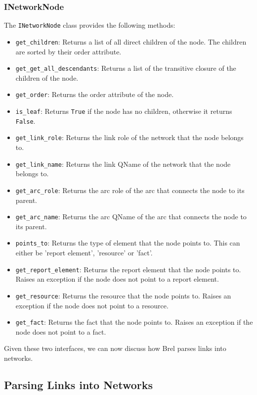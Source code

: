 \subsubsection{INetworkNode}

The \texttt{INetworkNode} class provides the following methods:

\begin{itemize}
    \item \texttt{get\_children}: Returns a list of all direct children of the node.
    The children are sorted by their order attribute.
    \item \texttt{get\_get\_all\_descendants}: Returns a list of the transitive closure of the children of the node.
    \item \texttt{get\_order}: Returns the order attribute of the node.
    \item \texttt{is\_leaf}: Returns \texttt{True} if the node has no children, otherwise it returns \texttt{False}.
    \item \texttt{get\_link\_role}: Returns the link role of the network that the node belongs to.
    \item \texttt{get\_link\_name}: Returns the link QName of the network that the node belongs to.
    \item \texttt{get\_arc\_role}: Returns the arc role of the arc that connects the node to its parent.
    \item \texttt{get\_arc\_name}: Returns the arc QName of the arc that connects the node to its parent.
    \item \texttt{points\_to}: Returns the type of element that the node points to.
    This can either be 'report element', 'resource' or 'fact'.
    \item \texttt{get\_report\_element}: Returns the report element that the node points to.
    Raises an exception if the node does not point to a report element.
    \item \texttt{get\_resource}: Returns the resource that the node points to.
    Raises an exception if the node does not point to a resource.
    \item \texttt{get\_fact}: Returns the fact that the node points to.
    Raises an exception if the node does not point to a fact.

\end{itemize}

Given these two interfaces, we can now discuss how Brel parses links into networks.

\subsection{Parsing Links into Networks}

